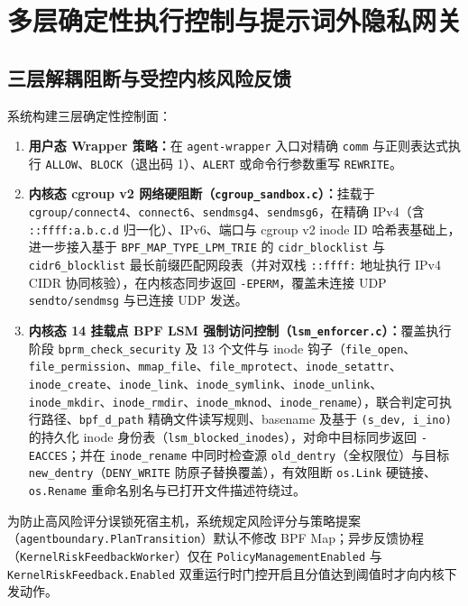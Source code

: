 \documentclass[UTF8,a4paper,zihao=-4,twocolumn]{ctexart}
\newcommand{\code}[1]{\texttt{\small #1}}
\begin{document}
\section{多层确定性执行控制与提示词外隐私网关}
\label{sec:control}

\subsection{三层解耦阻断与受控内核风险反馈}
系统构建三层确定性控制面：
\begin{enumerate}
  \item \textbf{用户态 Wrapper 策略：}在 \code{agent-wrapper} 入口对精确 \code{comm} 与正则表达式执行 \code{ALLOW}、\code{BLOCK}（退出码 1）、\code{ALERT} 或命令行参数重写 \code{REWRITE}。
  \item \textbf{内核态 cgroup v2 网络硬阻断（\code{cgroup\_sandbox.c}）：}挂载于 \code{cgroup/connect4}、\code{connect6}、\code{sendmsg4}、\code{sendmsg6}，在精确 IPv4（含 \code{::ffff:a.b.c.d} 归一化）、IPv6、端口与 cgroup v2 inode ID 哈希表基础上，进一步接入基于 \code{BPF\_MAP\_TYPE\_LPM\_TRIE} 的 \code{cidr\_blocklist} 与 \code{cidr6\_blocklist} 最长前缀匹配网段表（并对双栈 \code{::ffff:} 地址执行 IPv4 CIDR 协同核验），在内核态同步返回 \code{-EPERM}，覆盖未连接 UDP \code{sendto/sendmsg} 与已连接 UDP 发送。
  \item \textbf{内核态 14 挂载点 BPF LSM 强制访问控制（\code{lsm\_enforcer.c}）：}覆盖执行阶段 \code{bprm\_check\_security} 及 13 个文件与 inode 钩子（\code{file\_open}、\code{file\_permission}、\code{mmap\_file}、\code{file\_mprotect}、\code{inode\_setattr}、\code{inode\_create}、\code{inode\_link}、\code{inode\_symlink}、\code{inode\_unlink}、\code{inode\_mkdir}、\code{inode\_rmdir}、\code{inode\_mknod}、\code{inode\_rename}），联合判定可执行路径、\code{bpf\_d\_path} 精确文件读写规则、basename 及基于 \code{(s\_dev, i\_ino)} 的持久化 inode 身份表（\code{lsm\_blocked\_inodes}），对命中目标同步返回 \code{-EACCES}；并在 \code{inode\_rename} 中同时检查源 \code{old\_dentry}（全权限位）与目标 \code{new\_dentry}（\code{DENY\_WRITE} 防原子替换覆盖），有效阻断 \code{os.Link} 硬链接、\code{os.Rename} 重命名别名与已打开文件描述符绕过。
\end{enumerate}

为防止高风险评分误锁死宿主机，系统规定风险评分与策略提案（\code{agentboundary.PlanTransition}）默认不修改 BPF Map；异步反馈协程（\code{KernelRiskFeedbackWorker}）仅在 \code{PolicyManagementEnabled} 与 \code{KernelRiskFeedback.Enabled} 双重运行时门控开启且分值达到阈值时才向内核下发动作。
\end{document}
